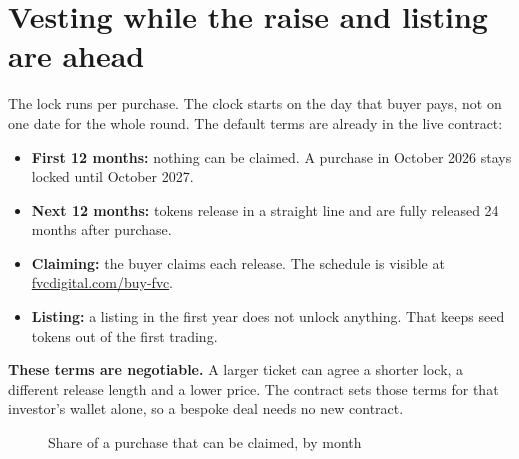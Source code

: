 \documentclass[paper=a4,captions=tableheading]{scrartcl}
\providecommand{\tightlist}{\setlength{\itemsep}{0pt}\setlength{\parskip}{0pt}}
\begin{document}
\section{Vesting while the raise and listing are ahead}

The lock runs per purchase. The clock starts on the day that buyer pays, not on one date for the whole round. The default terms are already in the live contract:

\begin{itemize}
\tightlist
\item \textbf{First 12 months:} nothing can be claimed. A purchase in October 2026 stays locked until October 2027.
\item \textbf{Next 12 months:} tokens release in a straight line and are fully released 24 months after purchase.
\item \textbf{Claiming:} the buyer claims each release. The schedule is visible at \href{https://fvcdigital.com/buy-fvc}{fvcdigital.com/buy-fvc}.
\item \textbf{Listing:} a listing in the first year does not unlock anything. That keeps seed tokens out of the first trading.
\end{itemize}

\textbf{These terms are negotiable.} A larger ticket can agree a shorter lock, a different release length and a lower price. The contract sets those terms for that investor's wallet alone, so a bespoke deal needs no new contract.

\begin{figure}
\caption{Share of a purchase that can be claimed, by month}
\centering
{}
\end{figure}
\end{document}
